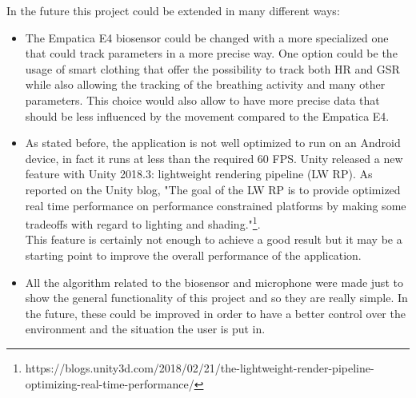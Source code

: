 In the future this project could be extended in many different ways:
\begin{itemize}
	\item The Empatica E4 biosensor could be changed with a more specialized one that could track parameters in a more precise way. One option could be the usage of smart clothing that offer the possibility to track both HR and GSR while also allowing the tracking of the breathing activity and many other parameters. This choice would also allow to have more precise data that should be less influenced by the movement compared to the Empatica E4.
	\item As stated before, the application is not well optimized to run on an Android device, in fact it runs at less than the required 60 FPS. Unity released a new feature with Unity 2018.3: lightweight rendering pipeline (LW RP). As reported on the Unity blog, "The goal of the LW RP is to provide optimized real time performance on performance constrained platforms by making some tradeoffs with regard to lighting and shading."\footnote{https://blogs.unity3d.com/2018/02/21/the-lightweight-render-pipeline-optimizing-real-time-performance/}.\\
	This feature is certainly not enough to achieve a good result but it may be a starting point to improve the overall performance of the application.
	\item All the algorithm related to the biosensor and microphone were made just to show the general functionality of this project and so they are really simple. In the future, these could be improved in order to have a better control over the environment and the situation the user is put in.
\end{itemize}